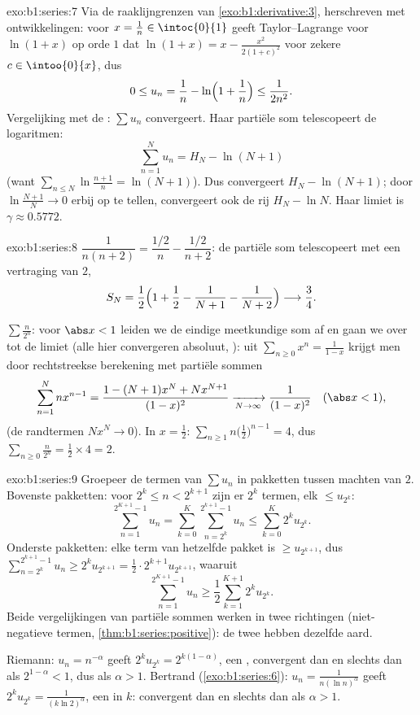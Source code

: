 \begin{solution}{exo:b1:series:7}
Via de raaklijngrenzen van \cref{exo:b1:derivative:3},
herschreven met ontwikkelingen: voor $x = \frac1n \in
\intoc{0}{1}$ geeft Taylor--Lagrange voor $\ln(1+x)$ op orde $1$
dat $\ln(1 + x) = x - \frac{x^2}{2(1 + c)^2}$ voor zekere $c \in
\intoo{0}{x}$, dus
\[
0 \leq u_n = \frac1n - \ln\Bigl(1 + \frac1n\Bigr) \leq
\frac{1}{2n^2} .
\]
Vergelijking met de : $\sum u_n$ convergeert. Haar
partiële som telescopeert de logaritmen:
\[
\sum_{n=1}^{N} u_n = H_N - \ln(N+1)
\]
(want $\sum_{n\leq N} \ln\frac{n+1}{n} = \ln(N+1)$). Dus
convergeert $H_N - \ln(N+1)$; door $\ln\frac{N+1}{N} \to 0$ erbij
op te tellen, convergeert ook de rij $H_N - \ln N$. Haar limiet is
$\gamma \approx 0.5772$.
\end{solution}

\begin{solution}{exo:b1:series:8}
$\dfrac{1}{n(n+2)} = \dfrac{1/2}{n} - \dfrac{1/2}{n+2}$: de partiële
som telescopeert met een vertraging van $2$,
\[
S_N = \frac12\Bigl(1 + \frac12 - \frac{1}{N+1} -
\frac{1}{N+2}\Bigr) \longrightarrow \frac34 .
\]

$\sum \frac{n}{2^n}$: voor $\abs x < 1$ leiden we de eindige
meetkundige som af en gaan we over tot de limiet (alle  hier
convergeren absoluut, ): uit $\sum_{n\geq0} x^n =
\frac{1}{1-x}$ krijgt men door rechtstreekse berekening met
partiële sommen
\[
\sum_{n=1}^{N} n x^{n-1}
= \frac{1 - (N+1)x^N + N x^{N+1}}{(1 - x)^2}
\xrightarrow[N\to\infty]{} \frac{1}{(1-x)^2}
\quad (\abs x < 1),
\]
(de randtermen $N x^N \to 0$). In $x = \frac12$:
$\sum_{n\geq1} n\bigl(\frac12\bigr)^{n-1} = 4$, dus $\sum_{n\geq0}
\frac{n}{2^n} = \frac12 \times 4 = 2$.
\end{solution}

\begin{solution}{exo:b1:series:9}
Groepeer de termen van $\sum u_n$ in pakketten tussen machten van
$2$. Bovenste pakketten: voor $2^k \leq n < 2^{k+1}$ zijn er $2^k$
termen, elk $\leq u_{2^k}$:
\[
\sum_{n=1}^{2^{K+1}-1} u_n
= \sum_{k=0}^{K} \sum_{n=2^k}^{2^{k+1}-1} u_n
\leq \sum_{k=0}^{K} 2^k u_{2^k} .
\]
Onderste pakketten: elke term van hetzelfde pakket is $\geq
u_{2^{k+1}}$, dus $\sum_{n=2^k}^{2^{k+1}-1} u_n \geq 2^k
u_{2^{k+1}} = \frac12 \cdot 2^{k+1} u_{2^{k+1}}$, waaruit
\[
\sum_{n=1}^{2^{K+1}-1} u_n \geq \frac12 \sum_{k=1}^{K+1} 2^{k}
u_{2^{k}} .
\]
Beide vergelijkingen van partiële sommen werken in twee richtingen
(niet-negatieve termen, \cref{thm:b1:series:positive}): de twee
 hebben dezelfde aard.

Riemann: $u_n = n^{-\alpha}$ geeft $2^k u_{2^k} =
2^{k(1-\alpha)}$, een , convergent dan en slechts
dan als $2^{1 - \alpha} < 1$, dus als $\alpha > 1$. Bertrand
(\cref{exo:b1:series:6}): $u_n = \frac{1}{n(\ln n)^\alpha}$ geeft
$2^k u_{2^k} = \frac{1}{(k\ln 2)^\alpha}$, een  in $k$:
convergent dan en slechts dan als $\alpha > 1$.
\end{solution}

